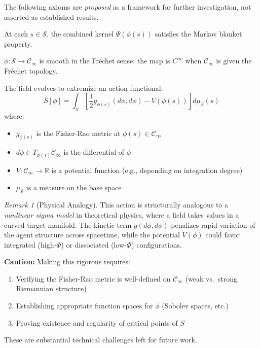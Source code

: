 \documentclass[11pt,a4paper]{article}
\theoremstyle{definition}
\theoremstyle{plain}
\theoremstyle{remark}
\newtheorem{remark}[definition]{Remark}
\begin{document}
The following axioms are \emph{proposed} as a framework for further investigation, not asserted as established results.

\begin{axiom}
At each $s \in \mathcal{S}$, the combined kernel $\Psi(\phi(s))$ satisfies the Markov blanket property.
\end{axiom}

\begin{axiom}[Smoothness]
$\phi: \mathcal{S} \to \mathcal{C}_\infty$ is smooth in the Fr\'echet sense: the map is $C^\infty$ when $\mathcal{C}_\infty$ is given the Fr\'echet topology.
\end{axiom}

\begin{axiom}
The field evolves to extremize an action functional:
\[
S[\phi] = \int_{\mathcal{S}} \left[ \frac{1}{2} g_{\phi(s)}(d\phi, d\phi) - V(\phi(s)) \right] d\mu_{\mathcal{S}}(s)
\]
where:
\begin{itemize}
    \item $g_{\phi(s)}$ is the Fisher-Rao metric at $\phi(s) \in \mathcal{C}_\infty$
    \item $d\phi \in T_{\phi(s)} \mathcal{C}_\infty$ is the differential of $\phi$
    \item $V: \mathcal{C}_\infty \to \mathbb{R}$ is a potential function (e.g., depending on integration degree)
    \item $\mu_{\mathcal{S}}$ is a measure on the base space
\end{itemize}
\end{axiom}

\begin{remark}[Physical Analogy]
This action is structurally analogous to a \emph{nonlinear sigma model} in theoretical physics, where a field takes values in a curved target manifold. The kinetic term $g(d\phi, d\phi)$ penalizes rapid variation of the agent structure across spacetime, while the potential $V(\phi)$ could favor integrated (high-$\Phi$) or dissociated (low-$\Phi$) configurations.

\textbf{Caution:} Making this rigorous requires:
\begin{enumerate}[label=(\roman*)]
    \item Verifying the Fisher-Rao metric is well-defined on $\mathcal{C}_\infty$ (weak vs.\ strong Riemannian structure)
    \item Establishing appropriate function spaces for $\phi$ (Sobolev spaces, etc.)
    \item Proving existence and regularity of critical points of $S$
\end{enumerate}
These are substantial technical challenges left for future work.
\end{remark}
\end{document}
